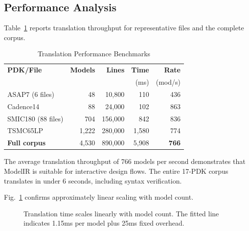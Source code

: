 \documentclass[conference]{IEEEtran}
\begin{document}
\subsection{Performance Analysis}

Table~\ref{tab:performance} reports translation throughput for representative files and the complete corpus.

\begin{table}[!t]
\caption{Translation Performance Benchmarks}
\label{tab:performance}
\centering
\renewcommand{\arraystretch}{1.15}
\begin{tabular}{@{}lrrrr@{}}
\toprule
\textbf{PDK/File} & \textbf{Models} & \textbf{Lines} & \textbf{Time} & \textbf{Rate} \\
 & & & (ms) & (mod/s) \\
\midrule
ASAP7 (6 files) & 48 & 10,800 & 110 & 436 \\
Cadence14 & 88 & 24,000 & 102 & 863 \\
SMIC180 (88 files) & 704 & 156,000 & 842 & 836 \\
TSMC65LP & 1,222 & 280,000 & 1,580 & 774 \\
\midrule
\textbf{Full corpus} & 4,530 & 890,000 & 5,908 & \textbf{766} \\
\bottomrule
\end{tabular}
\end{table}

The average translation throughput of 766 models per second demonstrates that ModelIR is suitable for interactive design flows. The entire 17-PDK corpus translates in under 6 seconds, including syntax verification.

Fig.~\ref{fig:scaling} confirms approximately linear scaling with model count.

\begin{figure}[!t]
\centering
{}
\caption{Translation time scales linearly with model count. The fitted line indicates 1.15ms per model plus 25ms fixed overhead.}
\label{fig:scaling}
\end{figure}
\end{document}

